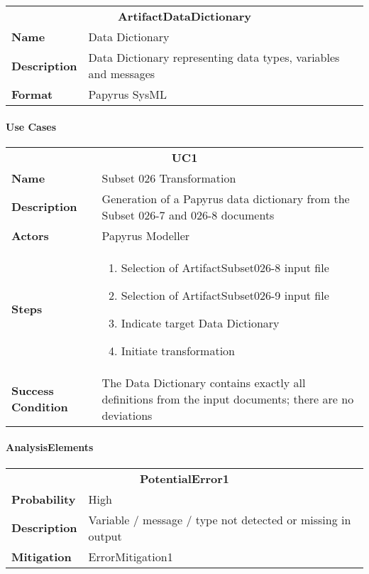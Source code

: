 \begin{tabular}{|lp{}|}
\hline
\multicolumn{2}{|c|}{\bf ArtifactDataDictionary}\\
\bf Name& Data Dictionary\\
\bf Description&Data Dictionary representing data types, variables and messages\\
\bf Format&Papyrus SysML\\
\hline
\end{tabular}

\paragraph{Use Cases}

\begin{tabular}{|lp{}|}
\hline
\multicolumn{2}{|c|}{\bf UC1}\\
\bf Name& Subset 026 Transformation\\
\bf Description&Generation of a Papyrus data dictionary from the Subset 026-7 and 026-8 documents\\
\bf Actors&Papyrus Modeller\\
\bf Steps&\begin{enumerate} 
		\item Selection of ArtifactSubset026-8 input file
		\item Selection of ArtifactSubset026-9 input file
		\item Indicate target Data Dictionary
		\item Initiate transformation
	\end{enumerate}\\
\bf Success Condition&The Data Dictionary contains exactly all definitions from the input documents; there are no deviations\\
\hline
\end{tabular}

\paragraph{AnalysisElements}

\begin{tabular}{|lp{}|}
\hline
\multicolumn{2}{|c|}{\bf PotentialError1}\\
\bf Probability&High\\
\bf Description&Variable / message / type not detected or missing in output\\
\bf Mitigation&ErrorMitigation1\\
\hline
\end{tabular}

